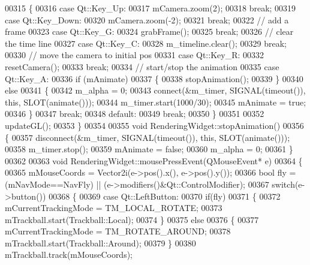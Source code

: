 \begin{DoxyCode}
00315     \{
00316       \textcolor{keywordflow}{case} Qt::Key\_Up:
00317         mCamera.zoom(2);
00318         \textcolor{keywordflow}{break};
00319       \textcolor{keywordflow}{case} Qt::Key\_Down:
00320         mCamera.zoom(-2);
00321         \textcolor{keywordflow}{break};
00322       \textcolor{comment}{// add a frame}
00323       \textcolor{keywordflow}{case} Qt::Key\_G:
00324         grabFrame();
00325         \textcolor{keywordflow}{break};
00326       \textcolor{comment}{// clear the time line}
00327       \textcolor{keywordflow}{case} Qt::Key\_C:
00328         m\_timeline.clear();
00329         \textcolor{keywordflow}{break};
00330       \textcolor{comment}{// move the camera to initial pos}
00331       \textcolor{keywordflow}{case} Qt::Key\_R:
00332         resetCamera();
00333         \textcolor{keywordflow}{break};
00334       \textcolor{comment}{// start/stop the animation}
00335       \textcolor{keywordflow}{case} Qt::Key\_A:
00336         \textcolor{keywordflow}{if} (mAnimate)
00337         \{
00338           stopAnimation();
00339         \}
00340         \textcolor{keywordflow}{else}
00341         \{
00342           m\_alpha = 0;
00343           connect(&m\_timer, SIGNAL(timeout()), \textcolor{keyword}{this}, SLOT(animate()));
00344           m\_timer.start(1000/30);
00345           mAnimate = \textcolor{keyword}{true};
00346         \}
00347         \textcolor{keywordflow}{break};
00348       \textcolor{keywordflow}{default}:
00349         \textcolor{keywordflow}{break};
00350     \}
00351 
00352     updateGL();
00353 \}
00354 
00355 \textcolor{keywordtype}{void} RenderingWidget::stopAnimation()
00356 \{
00357   disconnect(&m\_timer, SIGNAL(timeout()), \textcolor{keyword}{this}, SLOT(animate()));
00358   m\_timer.stop();
00359   mAnimate = \textcolor{keyword}{false};
00360   m\_alpha = 0;
00361 \}
00362 
00363 \textcolor{keywordtype}{void} RenderingWidget::mousePressEvent(QMouseEvent* e)
00364 \{
00365   mMouseCoords = Vector2i(e->pos().x(), e->pos().y());
00366   \textcolor{keywordtype}{bool} fly = (mNavMode==NavFly) || (e->modifiers()&Qt::ControlModifier);
00367   \textcolor{keywordflow}{switch}(e->button())
00368   \{
00369     \textcolor{keywordflow}{case} Qt::LeftButton:
00370       \textcolor{keywordflow}{if}(fly)
00371       \{
00372         mCurrentTrackingMode = TM\_LOCAL\_ROTATE;
00373         mTrackball.start(Trackball::Local);
00374       \}
00375       \textcolor{keywordflow}{else}
00376       \{
00377         mCurrentTrackingMode = TM\_ROTATE\_AROUND;
00378         mTrackball.start(Trackball::Around);
00379       \}
00380       mTrackball.track(mMouseCoords);

\end{DoxyCode}
